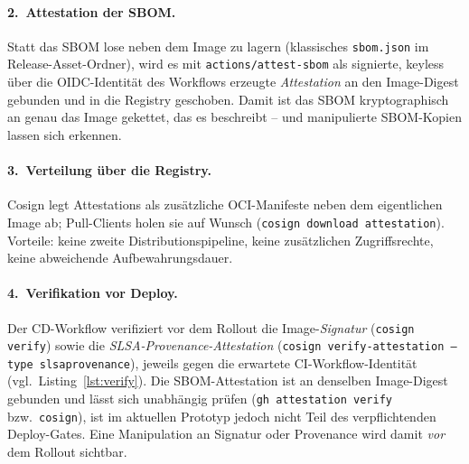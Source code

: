 \documentclass[12pt, a4paper]{scrartcl}
\begin{document}
\paragraph{2.~Attestation der SBOM.}
Statt das SBOM lose neben dem Image zu lagern (klassisches
\texttt{sbom.json} im Release-Asset-Ordner), wird es mit
\texttt{actions/attest-sbom} als signierte, keyless über die
OIDC-Identität des Workflows erzeugte \emph{Attestation} an den
Image-Digest gebunden und in die Registry geschoben. Damit ist das SBOM
kryptographisch an genau das Image gekettet, das es beschreibt -- und
manipulierte SBOM-Kopien lassen sich erkennen.

\paragraph{3.~Verteilung über die Registry.}
Cosign legt Attestations als zusätzliche OCI-Manifeste neben dem
eigentlichen Image ab; Pull-Clients holen sie auf Wunsch
(\texttt{cosign download attestation}). Vorteile: keine zweite
Distributionspipeline, keine zusätzlichen Zugriffsrechte, keine
abweichende Aufbewahrungsdauer.

\paragraph{4.~Verifikation vor Deploy.}
Der CD-Workflow verifiziert vor dem Rollout die Image-\emph{Signatur}
(\texttt{cosign verify}) sowie die \emph{SLSA-Provenance-Attestation}
(\texttt{cosign verify-attestation --type slsaprovenance}), jeweils
gegen die erwartete CI-Workflow-Identität (vgl.\ Listing~\ref{lst:verify}).
Die SBOM-Attestation ist an denselben Image-Digest gebunden und lässt
sich unabhängig prüfen (\texttt{gh attestation verify} bzw.\ \texttt{cosign}),
ist im aktuellen Prototyp jedoch nicht Teil des verpflichtenden
Deploy-Gates. Eine Manipulation an Signatur oder Provenance wird damit
\emph{vor} dem Rollout sichtbar.
\end{document}
